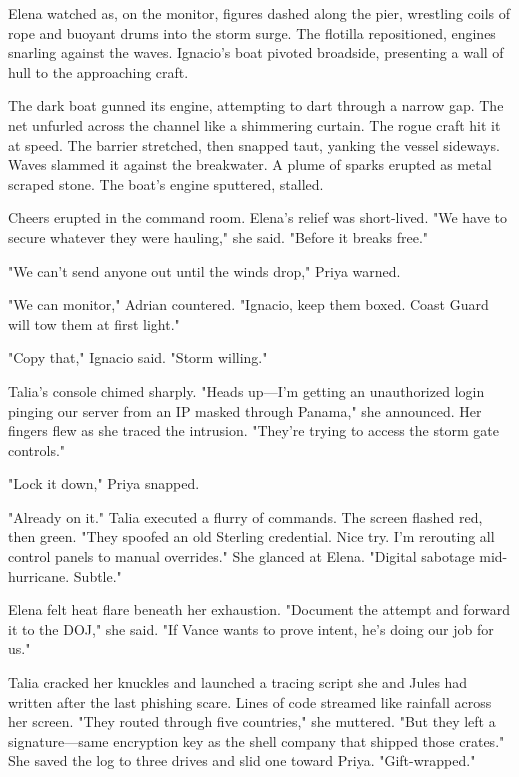 Elena watched as, on the monitor, figures dashed along the pier, wrestling coils of rope and buoyant drums into the storm surge. The flotilla repositioned, engines snarling against the waves. Ignacio's boat pivoted broadside, presenting a wall of hull to the approaching craft.

The dark boat gunned its engine, attempting to dart through a narrow gap. The net unfurled across the channel like a shimmering curtain. The rogue craft hit it at speed. The barrier stretched, then snapped taut, yanking the vessel sideways. Waves slammed it against the breakwater. A plume of sparks erupted as metal scraped stone. The boat's engine sputtered, stalled.

Cheers erupted in the command room. Elena's relief was short-lived. "We have to secure whatever they were hauling," she said. "Before it breaks free."

"We can't send anyone out until the winds drop," Priya warned.

"We can monitor," Adrian countered. "Ignacio, keep them boxed. Coast Guard will tow them at first light."

"Copy that," Ignacio said. "Storm willing."

Talia's console chimed sharply. "Heads up—I'm getting an unauthorized login pinging our server from an IP masked through Panama," she announced. Her fingers flew as she traced the intrusion. "They're trying to access the storm gate controls."

"Lock it down," Priya snapped.

"Already on it." Talia executed a flurry of commands. The screen flashed red, then green. "They spoofed an old Sterling credential. Nice try. I'm rerouting all control panels to manual overrides." She glanced at Elena. "Digital sabotage mid-hurricane. Subtle."

Elena felt heat flare beneath her exhaustion. "Document the attempt and forward it to the DOJ," she said. "If Vance wants to prove intent, he's doing our job for us."

Talia cracked her knuckles and launched a tracing script she and Jules had written after the last phishing scare. Lines of code streamed like rainfall across her screen. "They routed through five countries," she muttered. "But they left a signature—same encryption key as the shell company that shipped those crates." She saved the log to three drives and slid one toward Priya. "Gift-wrapped."

\bigskip

